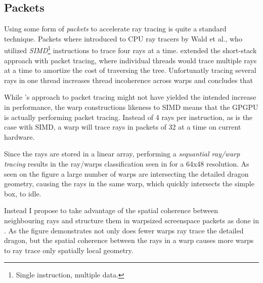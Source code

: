 \subsection{Packets}


Using some form of \textit{packets} to accelerate ray tracing is quite
a standard technique. Packets where introduced to CPU ray tracers by
Wald et al., who utilized
\textit{SIMD}\footnote{Single instruction, multiple data.}
instructions to trace four rays at a time. \horn{} extended the
short-stack approach with packet tracing, where individual threads
would trace multiple rays at a time to amortize the cost of traversing
the tree. Unfortunatly tracing several rays in one thread increases
thread incoherence across warps and \aila{} concludes that




While \horn's approach to packet tracing might not have yielded the
intended increase in performance, the warp constructions likeness to
SIMD means that the GPGPU is actually performing packet tracing.
Instead of 4 rays per instruction, as is the case with SIMD, a warp
will trace rays in packets of 32 at a time on current hardware.

Since the rays are stored in a linear array, performing a
\textit{sequantial ray/warp tracing} results in the ray/warps
classification seen in  for a 64x48
resolution. As seen on the figure a large number of warps are
intersecting the detailed dragon geometry, causing the rays in the
same warp, which quickly intersects the simple box, to idle.

Instead I propose to take advantage of the spatial coherence between
neighbouring rays and structure them in warpsized screenspace packets
as done in . As the figure demonstrates
not only does fewer warps ray trace the detailed dragon, but the
spatial coherence between the rays in a warp causes more warps to ray
trace only spatially local geometry.

